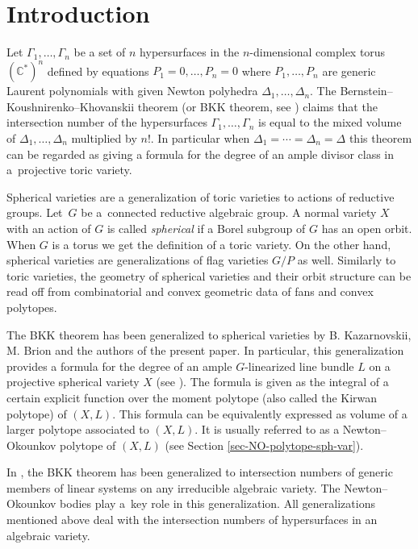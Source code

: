 \documentclass[pdftex]{sigma}
\numberwithin{equation}{section}
\theoremstyle{definition}
\begin{document}
\section{Introduction}
Let $\Gamma_1,\ldots,\Gamma_n$ be a set of $n$ hypersurfaces in the $n$-dimensional complex torus $(\mathbb C^*)^n$ defined by equations $P_1=0,\ldots, P_n = 0$ where $P_1,\ldots,P_n$ are generic Laurent polynomials with given Newton polyhedra $\Delta_1,\ldots,\Delta_n$. The Bernstein--Koushnirenko--Khovanskii theorem (or BKK theorem, see \cite{Bernstein, Khovanskii-genus, Koushnirenko}) claims that the intersection number of the hypersurfaces $\Gamma_1,\ldots,\Gamma_n$ is equal to the mixed volume of $\Delta_1, \ldots, \Delta_n$ multiplied by $n!$. In particular when $\Delta_1=\cdots=\Delta_n=\Delta$ this theo\-rem can be regarded as giving a formula for the degree of an ample divisor class in a~projective toric variety.

Spherical varieties are a generalization of toric varieties to actions of reductive groups. Let~$G$ be a~connected reductive algebraic group. A normal variety $X$ with an action of $G$ is called {\it spherical} if a Borel subgroup of $G$ has an open orbit. When $G$ is a torus we get the definition of a toric variety. On the other hand, spherical varieties are generalizations of flag varieties $G/P$ as well. Similarly to toric varieties, the geometry of spherical varieties and their orbit structure can be read off from combinatorial and convex geometric data of fans and convex polytopes.

The BKK theorem has been generalized to spherical varieties by B. Kazarnovskii, M. Brion and the authors of the present paper. In particular, this generalization provides a formula for the degree of an ample $G$-linearized line bundle $L$ on a projective spherical variety $X$ (see \cite{Brion, Kazarnovskii, KKh-reductive}). The formula is given as the integral of a certain explicit function over the moment polytope (also called the Kirwan polytope) of $(X, L)$. This formula can be equivalently expressed as volume of a larger polytope associated to $(X, L)$. It is usually referred to as a Newton--Okounkov polytope of $(X, L)$ (see Section \ref{sec-NO-polytope-sph-var}).

In \cite{KKh-Annals, LM}, the BKK theorem has been generalized to intersection numbers of generic members of linear systems on any irreducible algebraic variety. The Newton--Okounkov bodies play a~key role in this generalization. All generalizations mentioned above deal with the intersection numbers of hypersurfaces in an algebraic variety.
\end{document}
